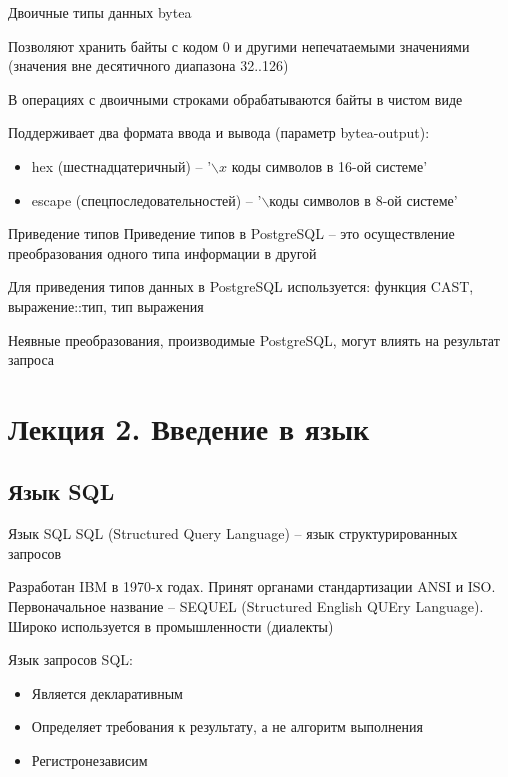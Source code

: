 \documentclass[12pt]{article}
\begin{document}
\begin{defin}{Двоичные типы данных}
    bytea

    Позволяют хранить байты с кодом 0 и другими непечатаемыми значениями (значения вне десятичного диапазона 32..126)

    В операциях с двоичными строками обрабатываются байты в чистом виде 

    Поддерживает два формата ввода и вывода (параметр bytea-output):

    \begin{itemize}
        \item hex (шестнадцатеричный) -- '$\backslash x$ коды символов в 16-ой системе'
        \item escape (спецпоследовательностей) -- '$\backslash$коды символов в 8-ой системе'
    \end{itemize}
\end{defin}

\begin{nota}{Приведение типов}
    Приведение типов в PostgreSQL -- это осуществление преобразования одного типа информации в другой

    Для приведения типов данных в PostgreSQL используется: функция CAST, выражение::тип, тип выражения 

    Неявные преобразования, производимые PostgreSQL, могут влиять на результат запроса
\end{nota}

\newpage

\section{Лекция 2. Введение в язык}

\subsection{Язык SQL}

\begin{defin}{Язык SQL}
    SQL (Structured Query Language) -- язык структурированных запросов 

    Разработан IBM в 1970-х годах. Принят органами стандартизации ANSI и ISO. Первоначальное название -- SEQUEL (Structured English QUEry Language). Широко используется в промышленности (диалекты)

    Язык запросов SQL:

    \begin{itemize}
        \item Является декларативным 
        \item Определяет требования к результату, а не алгоритм выполнения 
        \item Регистронезависим
    \end{itemize}
\end{defin}
\end{document}
